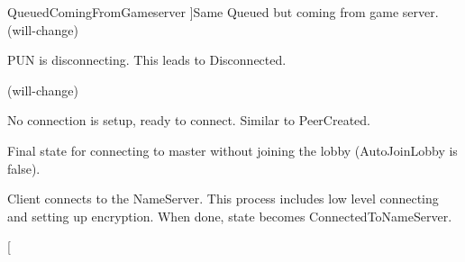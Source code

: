 \begin{Desc}
\begin{description}
{Queued\+Coming\+From\+Gameserver\hypertarget{group__public_api_gga91cc003c03acb26c6f1530440ebdbc88a88a122d877a08d17b85e005b97321320}{}\label{group__public_api_gga91cc003c03acb26c6f1530440ebdbc88a88a122d877a08d17b85e005b97321320}
}]Same Queued but coming from game server. (will-\/change)\item[{\em 
Disconnecting\hypertarget{group__public_api_gga91cc003c03acb26c6f1530440ebdbc88a10b0501000c144cb2a7424bd45e1bcde}{}\label{group__public_api_gga91cc003c03acb26c6f1530440ebdbc88a10b0501000c144cb2a7424bd45e1bcde}
}]P\+UN is disconnecting. This leads to Disconnected.

(will-\/change)\item[{\em 
Disconnected\hypertarget{group__public_api_gga91cc003c03acb26c6f1530440ebdbc88aef70e46fd3bbc21e3e1f0b6815e750c0}{}\label{group__public_api_gga91cc003c03acb26c6f1530440ebdbc88aef70e46fd3bbc21e3e1f0b6815e750c0}
}]No connection is setup, ready to connect. Similar to Peer\+Created.\item[{\em 
Connected\+To\+Master\hypertarget{group__public_api_gga91cc003c03acb26c6f1530440ebdbc88aaf3c26fc49c920a4779844921baeeef8}{}\label{group__public_api_gga91cc003c03acb26c6f1530440ebdbc88aaf3c26fc49c920a4779844921baeeef8}
}]Final state for connecting to master without joining the lobby (Auto\+Join\+Lobby is false).\item[{\em 
Connecting\+To\+Name\+Server\hypertarget{group__public_api_gga91cc003c03acb26c6f1530440ebdbc88ae047588dabb5a0b1e059604b80289791}{}\label{group__public_api_gga91cc003c03acb26c6f1530440ebdbc88ae047588dabb5a0b1e059604b80289791}
}]Client connects to the Name\+Server. This process includes low level connecting and setting up encryption. When done, state becomes Connected\+To\+Name\+Server.\item[{\em 
}
\end{description}
\end{Desc}
